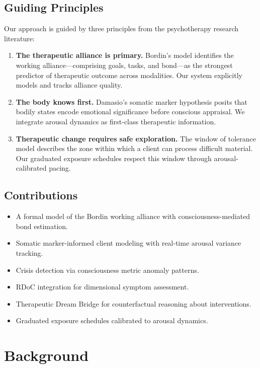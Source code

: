 \documentclass[11pt,a4paper]{article}
\begin{document}
\subsection{Guiding Principles}

Our approach is guided by three principles from the psychotherapy research literature:

\begin{enumerate}[nosep]
    \item \textbf{The therapeutic alliance is primary.} Bordin's model \citep{bordin1979} identifies the working alliance---comprising goals, tasks, and bond---as the strongest predictor of therapeutic outcome across modalities. Our system explicitly models and tracks alliance quality.
    \item \textbf{The body knows first.} Damasio's somatic marker hypothesis \citep{damasio1994} posits that bodily states encode emotional significance before conscious appraisal. We integrate arousal dynamics as first-class therapeutic information.
    \item \textbf{Therapeutic change requires safe exploration.} The window of tolerance model \citep{siegel1999} describes the zone within which a client can process difficult material. Our graduated exposure schedules respect this window through arousal-calibrated pacing.
\end{enumerate}

\subsection{Contributions}

\begin{itemize}[nosep]
    \item A formal model of the Bordin working alliance with consciousness-mediated bond estimation.
    \item Somatic marker-informed client modeling with real-time arousal variance tracking.
    \item Crisis detection via consciousness metric anomaly patterns.
    \item RDoC integration for dimensional symptom assessment.
    \item Therapeutic Dream Bridge for counterfactual reasoning about interventions.
    \item Graduated exposure schedules calibrated to arousal dynamics.
\end{itemize}

\section{Background}
\end{document}
